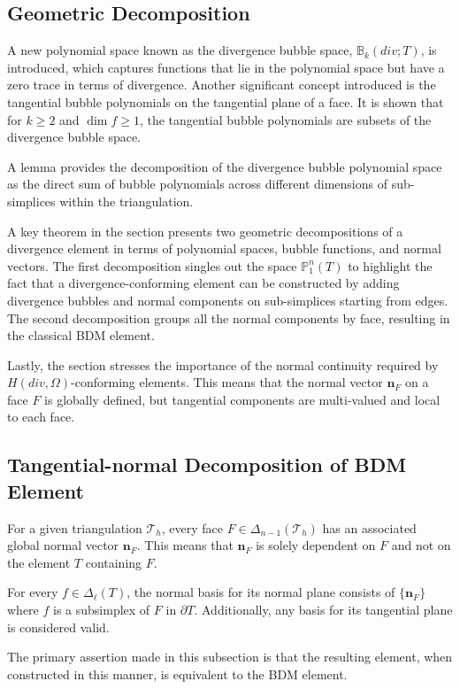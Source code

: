 \documentclass[12pt, a4paper]{article}
\newcommand{\bs}{\boldsymbol}
\begin{document}
\subsection{Geometric Decomposition}
A new polynomial space known as the divergence bubble space,
\(\mathbb{B}_k(div; T)\), is introduced, which captures functions that lie in
the polynomial space but have a zero trace in terms of divergence. Another
significant concept introduced is the tangential bubble polynomials on the
tangential plane of a face. It is shown that for \(k \geq 2\) and \(\dim f \geq
1\), the tangential bubble polynomials are subsets of the divergence bubble
space.

A lemma provides the decomposition of the divergence bubble polynomial space as
the direct sum of bubble polynomials across different dimensions of
sub-simplices within the triangulation.

A key theorem in the section presents two geometric decompositions of a
divergence element in terms of polynomial spaces, bubble functions, and normal
vectors. The first decomposition singles out the space \(\mathbb{P}_1^n(T)\) to
highlight the fact that a divergence-conforming element can be constructed by
adding divergence bubbles and normal components on sub-simplices starting from
edges. The second decomposition groups all the normal components by face,
resulting in the classical BDM element.

Lastly, the section stresses the importance of the normal continuity required by
\(H(div, \Omega)\)-conforming elements. This means that the normal vector \(\bs
n_F\) on a face \(F\) is globally defined, but tangential components are
multi-valued and local to each face.

\subsection{Tangential-normal Decomposition of BDM Element}

For a given triangulation \(\mathcal T_h\), every face \(F \in
\Delta_{n-1}(\mathcal T_h)\) has an associated global normal vector \(\bs n_F\).
This means that \(\bs n_F\) is solely dependent on \(F\) and not on the element
\(T\) containing \(F\).

For every \(f \in \Delta_{\ell}(T)\), the normal basis for its normal plane
consists of \(\{\bs n_F\}\) where \(f\) is a subsimplex of \(F\) in \(\partial
T\). Additionally, any basis for its tangential plane is considered valid.

The primary assertion made in this subsection is that the resulting element,
when constructed in this manner, is equivalent to the BDM element.
\end{document}
